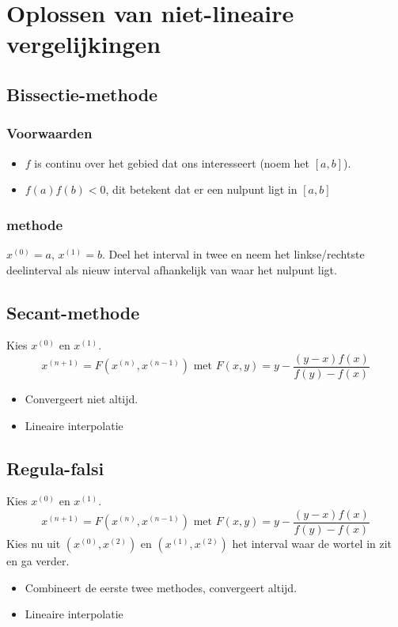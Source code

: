 \documentclass[samenvatting.tex]{subfiles}
\begin{document}
\chapter{Oplossen van niet-lineaire vergelijkingen}

\section{Bissectie-methode}
\subsection{Voorwaarden}
\begin{itemize}
\item $f$ is continu over het gebied dat ons interesseert (noem het $[a,b]$).
\item $f(a)f(b) <0$, dit betekent dat er een nulpunt ligt in $[a,b]$
\end{itemize}
\subsection{methode}
$x^{(0)}=a$, $x^{(1)}=b$.
Deel het interval in twee en neem het linkse/rechtste deelinterval als nieuw interval afhankelijk van waar het nulpunt ligt.

\section{Secant-methode}
Kies $x^{(0)}$ en $x^{(1)}$.
\[
x^{(n+1)} = F(x^{(n)}, x^{(n-1)}) \text{ met } F(x,y) = y-\frac{(y-x)f(x)}{f(y)-f(x)}
\]
\begin{itemize}
\item Convergeert niet altijd.
\item Lineaire interpolatie
\end{itemize}

\section{Regula-falsi}
Kies $x^{(0)}$ en $x^{(1)}$.
\[
x^{(n+1)} = F(x^{(n)}, x^{(n-1)}) \text{ met } F(x,y) = y-\frac{(y-x)f(x)}{f(y)-f(x)}
\]
Kies nu uit $(x^{(0)},x^{(2)})$ en $(x^{(1)},x^{(2)})$ het interval waar de wortel in zit en ga verder.
\begin{itemize}
\item Combineert de eerste twee methodes, convergeert altijd.
\item Lineaire interpolatie
\end{itemize}
\end{document}
